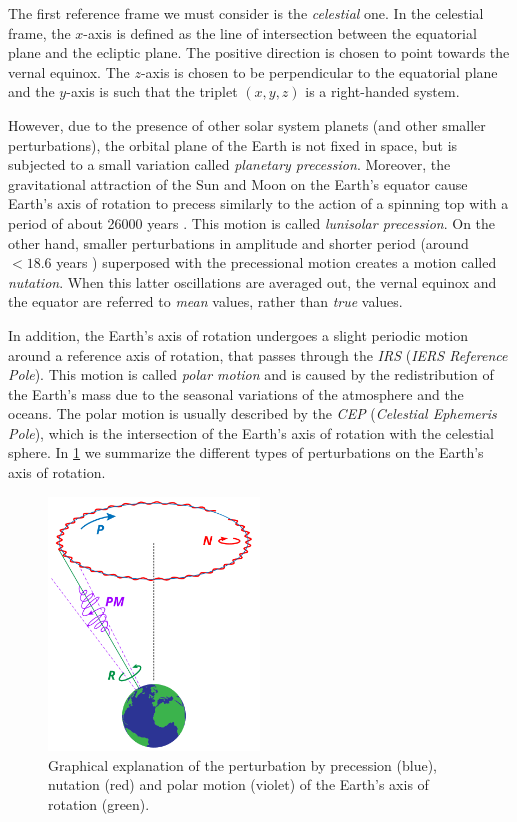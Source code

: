 \documentclass[../main.tex]{subfiles}
\begin{document}
The first reference frame we must consider is the \emph{celestial} one. In the celestial frame, the $x$-axis is defined as the line of intersection between the equatorial plane and the ecliptic plane. The positive direction is chosen to point towards the vernal equinox. The $z$-axis is chosen to be perpendicular to the equatorial plane and the $y$-axis is such that the triplet $(x,y,z)$ is a right-handed system.

However, due to the presence of other solar system planets (and other smaller perturbations), the orbital plane of the Earth is not fixed in space, but is subjected to a small variation called \emph{planetary precession}. Moreover, the gravitational attraction of the Sun and Moon on the Earth's equator cause Earth's axis of rotation to precess similarly to the action of a spinning top with a period of about 26000 years \cite{montenbruck}. This motion is called \emph{lunisolar precession}. On the other hand, smaller perturbations in amplitude and shorter period (around $<18.6$ years \cite{wiki:eci}) superposed with the precessional motion creates a motion called \emph{nutation}. When this latter oscillations are averaged out, the vernal equinox and the equator are referred to \emph{mean} values, rather than \emph{true} values.

In addition, the Earth's axis of rotation undergoes a slight periodic motion around a reference axis of rotation, that passes through the \emph{IRS} (\emph{IERS Reference Pole}). This motion is called \emph{polar motion} and is caused by the redistribution of the Earth's mass due to the seasonal variations of the atmosphere and the oceans. The polar motion is usually described by the \emph{CEP} (\emph{Celestial Ephemeris Pole}), which is the intersection of the Earth's axis of rotation with the celestial sphere. In \cref{fig:prec_nut} we summarize the different types of perturbations on the Earth's axis of rotation.

\begin{figure}[ht]
  \centering
  \includegraphics[width=0.5\textwidth]{Images/precession_nutation.pdf}
  \caption{Graphical explanation of the perturbation by precession (blue), nutation (red) and polar motion (violet) of the Earth's axis of rotation (green).}
  \label{fig:prec_nut}
\end{figure}
\end{document}

